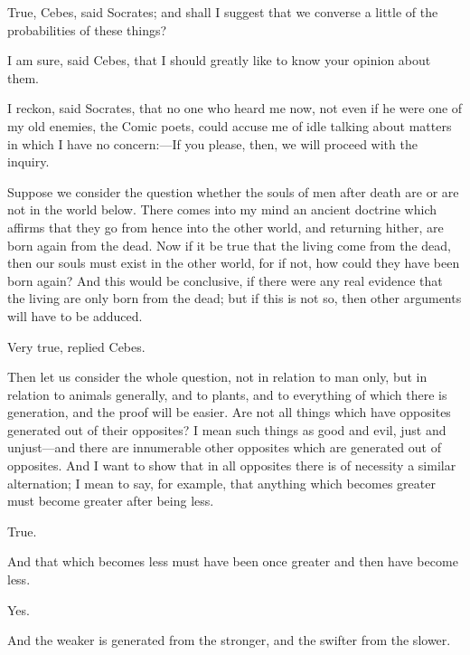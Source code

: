 \documentclass[11pt,letter]{article}
\begin{document}
\par  True, Cebes, said Socrates; and shall I suggest that we converse a little of the probabilities of these things?

\par  I am sure, said Cebes, that I should greatly like to know your opinion about them.

\par  I reckon, said Socrates, that no one who heard me now, not even if he were one of my old enemies, the Comic poets, could accuse me of idle talking about matters in which I have no concern:—If you please, then, we will proceed with the inquiry.

\par  Suppose we consider the question whether the souls of men after death are or are not in the world below. There comes into my mind an ancient doctrine which affirms that they go from hence into the other world, and returning hither, are born again from the dead. Now if it be true that the living come from the dead, then our souls must exist in the other world, for if not, how could they have been born again? And this would be conclusive, if there were any real evidence that the living are only born from the dead; but if this is not so, then other arguments will have to be adduced.

\par  Very true, replied Cebes.

\par  Then let us consider the whole question, not in relation to man only, but in relation to animals generally, and to plants, and to everything of which there is generation, and the proof will be easier. Are not all things which have opposites generated out of their opposites? I mean such things as good and evil, just and unjust—and there are innumerable other opposites which are generated out of opposites. And I want to show that in all opposites there is of necessity a similar alternation; I mean to say, for example, that anything which becomes greater must become greater after being less.

\par  True.

\par  And that which becomes less must have been once greater and then have become less.

\par  Yes.

\par  And the weaker is generated from the stronger, and the swifter from the slower.
\end{document}
